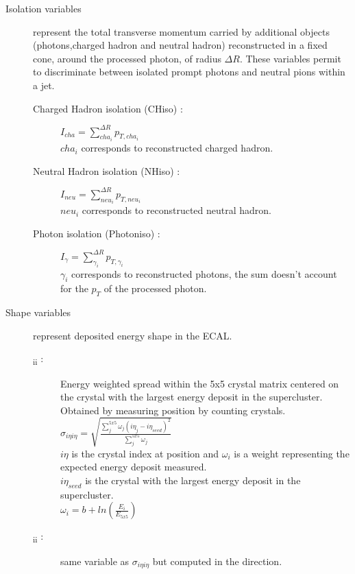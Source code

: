\begin{description}
    \item [Isolation variables] represent the total transverse momentum carried by additional objects (photons,charged hadron and neutral hadron) reconstructed
    in a fixed cone, around the processed photon, of radius $\Delta R$. These variables permit to discriminate between isolated
    prompt photons and neutral pions within a jet.
    \begin{description}
	    \item [Charged Hadron isolation (CHiso) : ] $I_{cha} = \sum_{cha_i}^{\Delta R}{p_{T,cha_i}}$ \\
            $cha_i$ corresponds to reconstructed charged hadron.
	    \item [Neutral Hadron isolation (NHiso) : ] $I_{neu} = \sum_{neu_i}^{\Delta R}{p_{T,neu_i}}$ \\
            $neu_i$ corresponds to reconstructed neutral hadron.
        \item [Photon isolation (Photoniso) : ] $I_\gamma = \sum_{\gamma_i}^{\Delta R}{p_{T,\gamma_i}}$ \\
            $\gamma_i$ corresponds to reconstructed photons, the sum doesn't account for the $p_T$ of the processed
            photon.
	\\
    \end{description}
    \item [Shape variables] represent deposited energy shape in the ECAL.
    \begin{description}
    	\item [\textsigma\textsubscript{i\texteta i\texteta} :] Energy weighted spread within the 5x5 crystal matrix centered on the crystal with the largest energy deposit in the supercluster. Obtained by measuring position by counting crystals. \\
		$ \sigma_{i \eta i \eta} = \sqrt{\frac{\sum^{5x5}_{j}\omega_j (i \eta_j - i \eta_{seed})^2}{\sum^{5x5}_{j}\omega_j}}$ \\
		$i \eta$ is the crystal index at position \texteta and $\omega_i$ is a weight representing the expected energy deposit measured.\\
		$i\eta_{seed} $ is the crystal with the largest energy deposit in the supercluster.\\
		$\omega_i = b + ln(\frac{E_i}{E_{5x5}})$
		\item [\textsigma\textsubscript{i\textphi i\textphi} :] same variable as $ \sigma_{i \eta i \eta}$ but computed in the \textphi direction.

\end{description}
\end{description}
